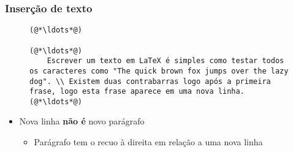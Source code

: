 \begin{frame}[fragile] \frametitle{Inserção de texto}
\begin{figure}[!t]
\begin{lstlisting}
(@*\ldots*@)

(@*\ldots*@)
	Escrever um texto em LaTeX é simples como testar todos os caracteres como "The quick brown fox jumps over the lazy dog". \\ Existem duas contrabarras logo após a primeira frase, logo esta frase aparece em uma nova linha.
(@*\ldots*@)

\end{lstlisting}
\end{figure}

\begin{itemize}
	\item Nova linha \textbf{não é} novo parágrafo
	\begin{itemize}
		\item Parágrafo tem o recuo à direita em relação a uma nova linha
	\end{itemize}
\end{itemize}
\end{frame}

	